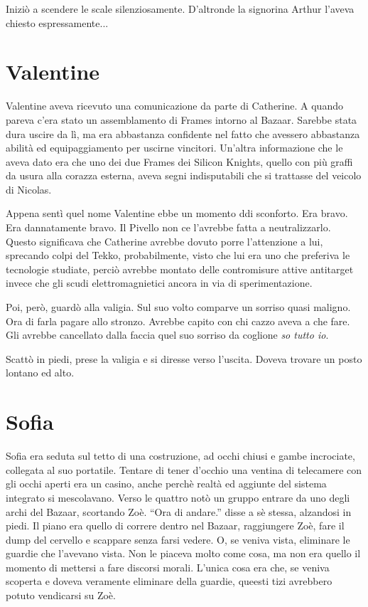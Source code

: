     Iniziò a scendere le scale silenziosamente. D'altronde la signorina Arthur l'aveva chiesto espressamente...

  \section*{Valentine}

    Valentine aveva ricevuto una comunicazione da parte di Catherine. A quando pareva c'era stato un assemblamento di
    Frames intorno al Bazaar. Sarebbe stata dura uscire da lì, ma era abbastanza confidente nel fatto che avessero
    abbastanza abilità ed equipaggiamento per uscirne vincitori. Un'altra informazione che le aveva dato era che uno dei
    due Frames dei Silicon Knights, quello con più graffi da usura alla corazza esterna, aveva segni indisputabili che
    si trattasse del veicolo di Nicolas.

    Appena sentì quel nome Valentine ebbe un momento ddi sconforto. Era bravo. Era dannatamente bravo. Il Pivello non ce
    l'avrebbe fatta a neutralizzarlo. Questo significava che Catherine avrebbe dovuto porre l'attenzione a lui,
    sprecando colpi del Tekko, probabilmente, visto che lui era uno che preferiva le tecnologie studiate, perciò avrebbe
    montato delle contromisure attive antitarget invece che gli scudi elettromagnietici ancora in via di
    sperimentazione.

    Poi, però, guardò alla valigia. Sul suo volto comparve un sorriso quasi maligno. Ora di farla pagare allo stronzo.
    Avrebbe capito con chi cazzo aveva a che fare. Gli avrebbe cancellato dalla faccia quel suo sorriso da coglione
    \emph{so tutto io}.

    Scattò in piedi, prese la valigia e si diresse verso l'uscita. Doveva trovare un posto lontano ed alto.

  \section*{Sofia}

    Sofia era seduta sul tetto di una costruzione, ad occhi chiusi e gambe incrociate, collegata al suo portatile. Tentare di tener
    d'occhio una ventina di telecamere con gli occhi aperti era un casino, anche perchè realtà ed aggiunte del sistema
    integrato si mescolavano. Verso le quattro notò un gruppo entrare da uno degli archi del Bazaar, scortando Zoè.
    ``Ora di andare.'' disse a sè stessa, alzandosi in piedi. Il piano era quello di correre dentro nel Bazaar,
    raggiungere Zoè, fare il dump del cervello e scappare senza farsi vedere. O, se veniva vista, eliminare le guardie
    che l'avevano vista. Non le piaceva molto come cosa, ma non era quello il momento di mettersi a fare discorsi
    morali. L'unica cosa era che, se veniva scoperta e doveva veramente eliminare della guardie, queesti tizi avrebbero
    potuto vendicarsi su Zoè.

